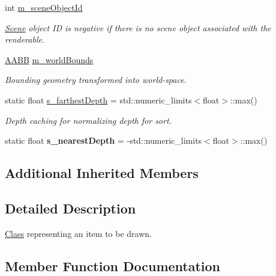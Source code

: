 \begin{DoxyCompactItemize}
int \mbox{\hyperlink{classrev_1_1_draw_command_a09fd2c6e7ae496a9d021baee1fe2f3a8}{m\+\_\+scene\+Object\+Id}}
\begin{DoxyCompactList}\small\item\em \mbox{\hyperlink{classrev_1_1_scene}{Scene}} object ID is negative if there is no scene object associated with the renderable. \end{DoxyCompactList}\item 
\mbox{\label{classrev_1_1_draw_command_aa89f6cf3875cfe2a080cd29c1f6d834f}} 
\mbox{\hyperlink{classrev_1_1_a_a_b_b}{A\+A\+BB}} \mbox{\hyperlink{classrev_1_1_draw_command_aa89f6cf3875cfe2a080cd29c1f6d834f}{m\+\_\+world\+Bounds}}
\begin{DoxyCompactList}\small\item\em Bounding geometry transformed into world-\/space. \end{DoxyCompactList}\item 
\mbox{\label{classrev_1_1_draw_command_ae19c54a67b4ab90bff90ac010ccd4d6d}} 
static float \mbox{\hyperlink{classrev_1_1_draw_command_ae19c54a67b4ab90bff90ac010ccd4d6d}{s\+\_\+farthest\+Depth}} = std\+::numeric\+\_\+limits$<$float$>$\+::max()
\begin{DoxyCompactList}\small\item\em Depth caching for normalizing depth for sort. \end{DoxyCompactList}\item 
\mbox{\label{classrev_1_1_draw_command_a15b93ed62b4c9d121435944fcf02d7eb}} 
static float {\bfseries s\+\_\+nearest\+Depth} = -\/std\+::numeric\+\_\+limits$<$float$>$\+::max()
\end{DoxyCompactItemize}
\subsection*{Additional Inherited Members}


\subsection{Detailed Description}
\mbox{\hyperlink{struct_class}{Class}} representing an item to be drawn. 

\subsection{Member Function Documentation}
\mbox{\label{classrev_1_1_draw_command_afecf1ad28081f50019326cdf97cd6b28}} 
